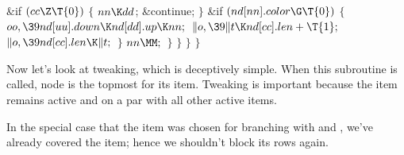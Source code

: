 \&{if} ${}(\\{cc}\Z\T{0}){}$\5
${}\{{}$\1\6
${}\\{nn}\K\\{dd}{}$;\5
\&{continue};\6
\4${}\}{}$\2\6
\&{if} ${}(\\{nd}[\\{nn}].\\{color}\G\T{0}){}$\5
${}\{{}$\1\6
${}\\{oo},\39\\{nd}[\\{uu}].\\{down}\K\\{nd}[\\{dd}].\\{up}\K\\{nn};{}$\6
${}\|o,\39\|t\K\\{nd}[\\{cc}].\\{len}+\T{1};{}$\6
${}\|o,\39\\{nd}[\\{cc}].\\{len}\K\|t;{}$\6
\4${}\}{}$\2\6
${}\\{nn}\MM;{}$\6
\4${}\}{}$\2\6
\4${}\}{}$\2\6
\4${}\}{}$\2\6
\4${}\}{}$\2\par
\fi

Now let's look at tweaking, which is deceptively simple. When this
subroutine is called, node  is the topmost for its item.
Tweaking is important because the item remains active and on a par
with all other active items.

In the special case that the item was chosen for branching with
 and , we've already covered the
item;
hence we shouldn't block its rows again.


